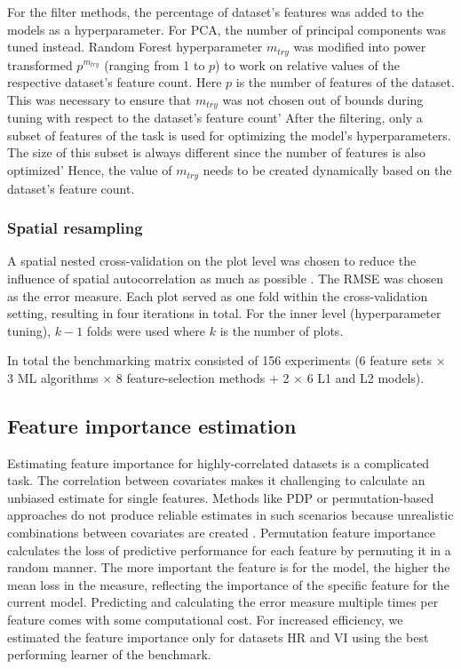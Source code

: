 \documentclass[letterpaper, peerreview, draftcls]{IEEEtran}
\begin{document}
For the filter methods, the percentage of dataset's features was added to the models as a hyperparameter.
For \ac{PCA}, the number of principal components was tuned instead.
Random Forest hyperparameter \texttt{\(m_{try}\)} was modified into power transformed \(p^{m_{try}}\) (ranging from 1 to $p$) to work on relative values of the respective dataset's feature count.
Here \(p\) is the number of features of the dataset.
This was necessary to ensure that \texttt{\(m_{try}\)} was not chosen out of bounds during tuning with respect to the dataset's feature count'
After the filtering, only a subset of features of the task is used for optimizing the model's hyperparameters.
The size of this subset is always different since the number of features is also optimized'
Hence, the value of \texttt{\(m_{try}\)} needs to be created dynamically based on the dataset's feature count.

\subsubsection{Spatial resampling}

\noindent A spatial nested cross-validation on the plot level was chosen to reduce the influence of spatial autocorrelation as much as possible \cite{schratz2019, sperrorest}.
The \ac{RMSE} was chosen as the error measure.
Each plot served as one fold within the cross-validation setting, resulting in four iterations in total.
For the inner level (hyperparameter tuning), \(k - 1\) folds were used where \(k\) is the number of plots.

In total the benchmarking matrix consisted of 156 experiments (6 feature sets $\times$ 3 ML algorithms $\times$ 8 feature-selection methods + 2 $\times$ 6 L1 and L2 models).

\subsection{Feature importance estimation}

\noindent Estimating feature importance for highly-correlated datasets is a complicated task.
The correlation between covariates makes it challenging to calculate an unbiased estimate for single features.
Methods like \ac{PDP} or permutation-based approaches do not produce reliable estimates in such scenarios because unrealistic combinations between covariates are created \cite{molnar2019}.
Permutation feature importance calculates the loss of predictive performance for each feature by permuting it in a random manner.
The more important the feature is for the model, the higher the mean loss in the measure, reflecting the importance of the specific feature for the current model.
Predicting and calculating the error measure multiple times per feature comes with some computational cost.
For increased efficiency, we estimated the feature importance only for datasets HR and VI using the best performing learner of the benchmark.
\end{document}
